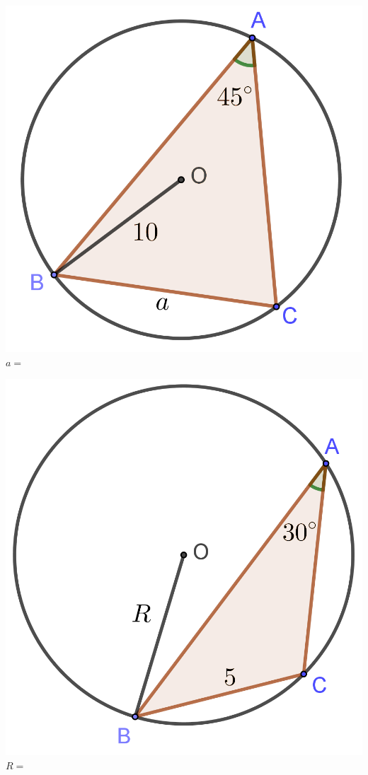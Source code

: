 \documentclass{oblivoir}
\begin{document}
\vspace{-20pt}
%
\label{sin4}
\begin{minipage}{.2\textwidth}\centering
\includegraphics[width=\textwidth]{sin_4-1}
\\\(a=\)
\end{minipage}
\qquad
\begin{minipage}{.2\textwidth}\centering
\includegraphics[width=\textwidth]{sin_4-2}
\\\(R=\)
\end{minipage}
\end{document}
